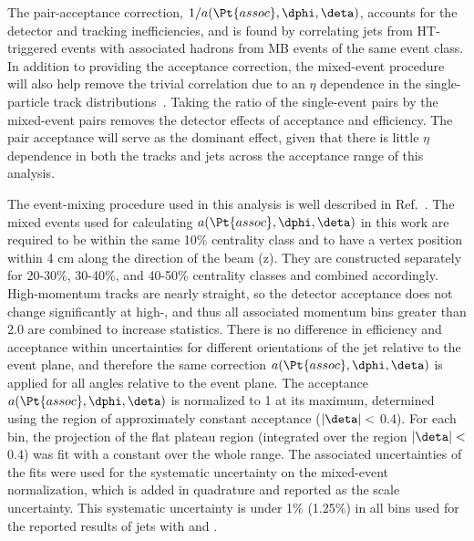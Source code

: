 The pair-acceptance correction, $1 / a(\Pt{assoc}, \text{\dphi}, \text{\deta})$, accounts for the detector and tracking inefficiencies, and is found by correlating jets from HT-triggered events with associated hadrons from MB events of the same event class. %
In addition to providing the acceptance correction, the mixed-event procedure will also help remove the trivial correlation due to an $\eta$ dependence in the single-particle track distributions~\cite{PhysRevC.101.064901}.  Taking the ratio of the single-event pairs by the mixed-event pairs removes the detector effects of acceptance and efficiency.  The pair acceptance will serve as the dominant effect, given that there is little $\eta$ dependence in both the tracks and jets across the acceptance range of this analysis.


The event-mixing procedure used in this analysis is well described in Ref.~\cite{PhysRevC.96.024905}.  The mixed events used for calculating $a(\Pt{assoc}, \text{\dphi}, \text{\deta})$ in this work are required to be within the same 10\% centrality class and to have a vertex position within 4 cm along the direction of the beam (z).  They are constructed separately for 20-30\%, 30-40\%, and 40-50\% centrality classes and combined accordingly.  High-momentum tracks are nearly straight, so the detector acceptance does not change significantly at high-, and thus all associated momentum bins greater than 2.0 \GeVc are combined to increase statistics.  There is no difference in efficiency and acceptance within uncertainties for different orientations of the jet relative to the event plane, and therefore the same correction $a(\Pt{assoc}, \text{\dphi}, \text{\deta})$ is applied for all angles relative to the event plane.  The acceptance $a(\Pt{assoc}, \text{\dphi}, \text{\deta})$ is normalized to 1 at its maximum, determined using the region of approximately constant acceptance ($|\deta| <$ 0.4).  For each  bin, the projection of the flat plateau region (integrated over the region $|\deta| <$ 0.4) was fit with a constant over the whole \dphi range.  The associated uncertainties of the fits were used for the systematic uncertainty on the mixed-event normalization, which is added in quadrature and reported as the scale uncertainty.  This systematic uncertainty is under 1\% (1.25\%) in all  bins used for the reported results of jets with   and  .

